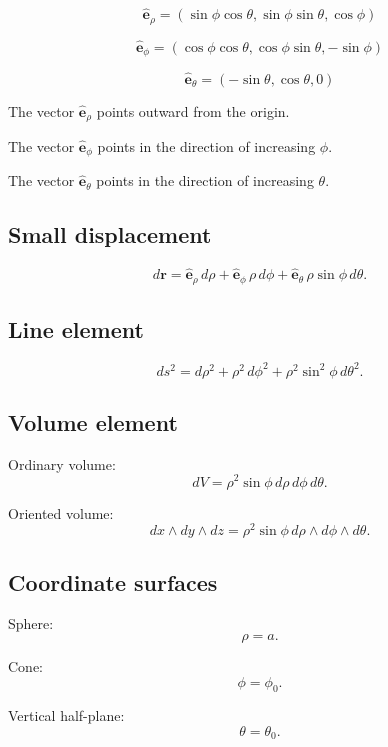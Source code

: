 \[
\boxed{
    \widehat{\mathbf e}_\rho
    =
    (\sin\phi\cos\theta,\sin\phi\sin\theta,\cos\phi)
}
\]

\[
\boxed{
    \widehat{\mathbf e}_\phi
    =
    (\cos\phi\cos\theta,\cos\phi\sin\theta,-\sin\phi)
}
\]

\[
\boxed{
    \widehat{\mathbf e}_\theta
    =
    (-\sin\theta,\cos\theta,0)
}
\]

The vector \(\widehat{\mathbf e}_\rho\) points outward from the origin.

The vector \(\widehat{\mathbf e}_\phi\) points in the direction of increasing \(\phi\).

The vector \(\widehat{\mathbf e}_\theta\) points in the direction of increasing \(\theta\).

\subsection*{Small displacement}

\[
\boxed{
    d\mathbf r
    =
    \widehat{\mathbf e}_\rho\,d\rho
    +
    \widehat{\mathbf e}_\phi\,\rho\,d\phi
    +
    \widehat{\mathbf e}_\theta\,\rho\sin\phi\,d\theta.
}
\]

\subsection*{Line element}

\[
\boxed{
    ds^2
    =
    d\rho^2+\rho^2\,d\phi^2+\rho^2\sin^2\phi\,d\theta^2.
}
\]

\subsection*{Volume element}

Ordinary volume:
\[
\boxed{
    dV=\rho^2\sin\phi\,d\rho\,d\phi\,d\theta.
}
\]

Oriented volume:
\[
\boxed{
    dx\wedge dy\wedge dz
    =
    \rho^2\sin\phi\,
    d\rho\wedge d\phi\wedge d\theta.
}
\]

\subsection*{Coordinate surfaces}

Sphere:
\[
\boxed{
    \rho=a.
}
\]

Cone:
\[
\boxed{
    \phi=\phi_0.
}
\]

Vertical half-plane:
\[
\boxed{
    \theta=\theta_0.
}
\]

